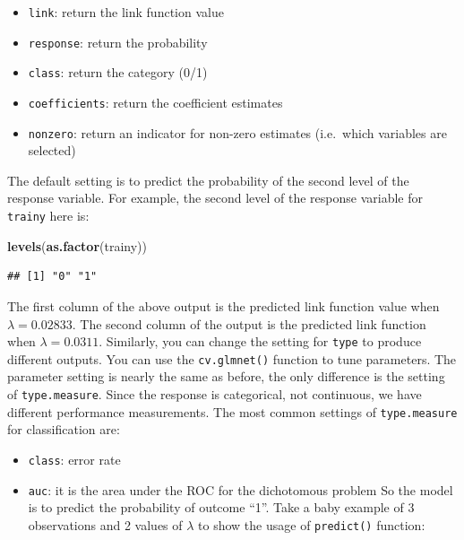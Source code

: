 \documentclass[12pt,]{krantz}
\makeatletter
\newenvironment{Shaded}{\begin{snugshade}}{\end{snugshade}}
\newcommand{\KeywordTok}[1]{\textcolor[rgb]{0.27,0.27,0.27}{\textbf{#1}}}
\newcommand{\NormalTok}[1]{#1}
\providecommand{\tightlist}{%
  \setlength{\itemsep}{0pt}\setlength{\parskip}{0pt}}
\newenvironment{kframe}{%
\medskip{}
\setlength{\fboxsep}{.8em}
 \def\at@end@of@kframe{}%
 \ifinner\ifhmode%
  \def\at@end@of@kframe{\end{minipage}}%
  \begin{minipage}{\columnwidth}%
 \fi\fi%
 \def\FrameCommand##1{\hskip\@totalleftmargin \hskip-\fboxsep
 \colorbox{shadecolor}{##1}\hskip-\fboxsep
     \hskip-\linewidth \hskip-\@totalleftmargin \hskip\columnwidth}%
 \MakeFramed {\advance\hsize-\width
   \@totalleftmargin\z@ \linewidth\hsize
   \@setminipage}}%
 {\par\unskip\endMakeFramed%
 \at@end@of@kframe}
\renewenvironment{Shaded}{\begin{kframe}}{\end{kframe}}
\makeatother
\begin{document}
\begin{itemize}
\tightlist
\item
  \texttt{link}: return the link function value
\item
  \texttt{response}: return the probability
\item
  \texttt{class}: return the category (0/1)
\item
  \texttt{coefficients}: return the coefficient estimates
\item
  \texttt{nonzero}: return an indicator for non-zero estimates (i.e.~which variables are selected)
\end{itemize}

The default setting is to predict the probability of the second level of the response variable. For example, the second level of the response variable for \texttt{trainy} here is:

\begin{Shaded}
\begin{Highlighting}[]
\KeywordTok{levels}\NormalTok{(}\KeywordTok{as.factor}\NormalTok{(trainy))}
\end{Highlighting}
\end{Shaded}

\begin{verbatim}
## [1] "0" "1"
\end{verbatim}

The first column of the above output is the predicted link function value when \(\lambda=0.02833\). The second column of the output is the predicted link function when \(\lambda=0.0311\). Similarly, you can change the setting for \texttt{type} to produce different outputs. You can use the \texttt{cv.glmnet()} function to tune parameters. The parameter setting is nearly the same as before, the only difference is the setting of \texttt{type.measure}. Since the response is categorical, not continuous, we have different performance measurements. The most common settings of \texttt{type.measure} for classification are:

\begin{itemize}
\tightlist
\item
  \texttt{class}: error rate
\item
  \texttt{auc}: it is the area under the ROC for the dichotomous problem
  So the model is to predict the probability of outcome ``1''. Take a baby example of 3 observations and 2 values of \(\lambda\) to show the usage of \texttt{predict()} function:
\end{itemize}
\end{document}
